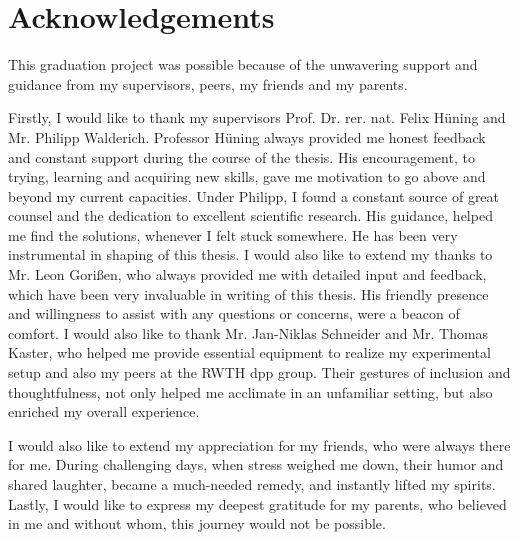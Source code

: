 \chapter*{Acknowledgements}
This graduation project was possible because of the unwavering support and guidance from my supervisors, peers, my friends and my parents.

\vspace{5mm}

\noindent Firstly, I would like to thank my supervisors Prof. Dr. rer. nat. Felix Hüning and Mr. Philipp Walderich. Professor Hüning always provided me honest feedback and constant support during the course of the thesis. His encouragement, to trying, learning and acquiring new skills, gave me motivation to go above and beyond my current capacities. Under Philipp, I found a constant source of great counsel and the dedication to excellent scientific research. His guidance, helped me find the solutions, whenever I felt stuck somewhere. He has been very instrumental in shaping of this thesis. I would also like to extend my thanks to Mr. Leon Gorißen, who always provided me with detailed input and feedback, which have been very invaluable in writing of this thesis. His friendly presence and willingness to assist with any questions or concerns, were a beacon of comfort. I would also like to thank Mr. Jan-Niklas Schneider and Mr. Thomas Kaster, who helped me provide essential equipment to realize my experimental setup and also my peers at the RWTH \ac{dpp} group. Their gestures of inclusion and thoughtfulness, not only helped me acclimate in an unfamiliar setting, but also enriched my overall experience.

\vspace{5mm}

\noindent I would also like to extend my appreciation for my friends, who were always there for me. During challenging days, when stress weighed me down, their humor and shared laughter, became a much-needed remedy, and instantly lifted my spirits. Lastly, I would like to express my deepest gratitude for my parents, who believed in me and without whom, this journey would not be possible.